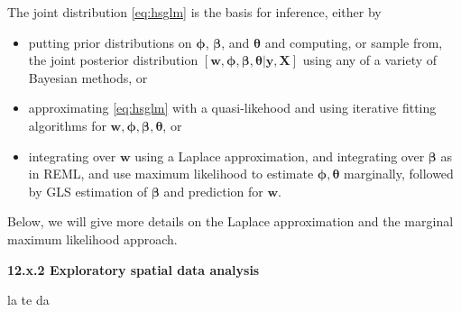 \documentclass[12pt, titlepage]{article}
\begin{document}
The joint distribution \ref{eq:hsglm} is the basis for inference, either by
\begin{itemize}
\item putting prior distributions on $\boldsymbol{\phi}$, $\boldsymbol{\beta}$, and $\boldsymbol{\theta}$ and computing, or sample from, the joint posterior distribution $[\mathbf{w},\boldsymbol{\phi},\boldsymbol{\beta},\boldsymbol{\theta}|\mathbf{y},\mathbf{X}]$ using any of a variety of Bayesian methods, or 
\item approximating \eqref{eq:hsglm} with a quasi-likehood and using iterative fitting algorithms for $\mathbf{w},\boldsymbol{\phi},\boldsymbol{\beta},\boldsymbol{\theta}$, or
\item integrating over $\mathbf{w}$ using a Laplace approximation, and integrating over $\boldsymbol{\beta}$ as in REML, and use maximum likelihood to estimate $\boldsymbol{\phi},\boldsymbol{\theta}$ marginally, followed by GLS estimation of $\boldsymbol{\beta}$ and prediction for $\mathbf{w}$.
\end{itemize}

Below, we will give more details on the Laplace approximation and the marginal maximum likelihood approach.


{\large \flushleft \textbf{12.x.2 Exploratory spatial data analysis}}

la te da

\end{document}
